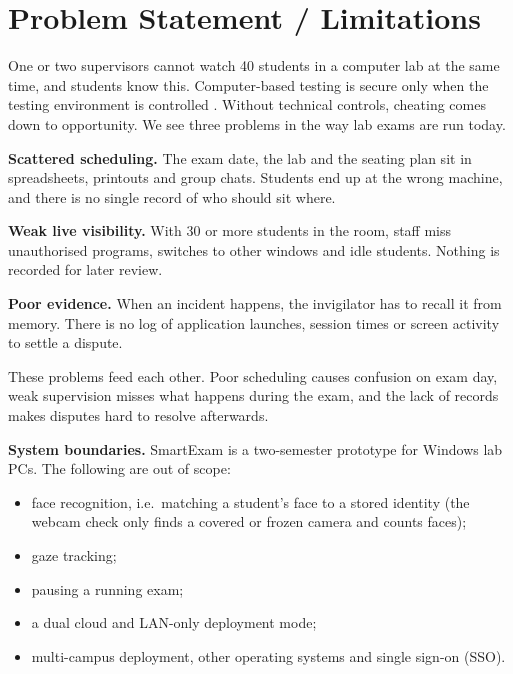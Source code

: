 \section{Problem Statement / Limitations}

One or two supervisors cannot watch 40 students in a computer lab at the same time, and students know this. Computer-based testing is secure only when the testing environment is controlled \cite{mit_cbt}. Without technical controls, cheating comes down to opportunity. We see three problems in the way lab exams are run today.

\textbf{Scattered scheduling.} The exam date, the lab and the seating plan sit in spreadsheets, printouts and group chats. Students end up at the wrong machine, and there is no single record of who should sit where.

\textbf{Weak live visibility.} With 30 or more students in the room, staff miss unauthorised programs, switches to other windows and idle students. Nothing is recorded for later review.

\textbf{Poor evidence.} When an incident happens, the invigilator has to recall it from memory. There is no log of application launches, session times or screen activity to settle a dispute.

These problems feed each other. Poor scheduling causes confusion on exam day, weak supervision misses what happens during the exam, and the lack of records makes disputes hard to resolve afterwards.

\textbf{System boundaries.} SmartExam is a two-semester prototype for Windows lab PCs. The following are out of scope:
\begin{itemize}[noitemsep]
\item face recognition, i.e.\ matching a student's face to a stored identity (the webcam check only finds a covered or frozen camera and counts faces);
\item gaze tracking;
\item pausing a running exam;
\item a dual cloud and LAN-only deployment mode;
\item multi-campus deployment, other operating systems and single sign-on (SSO).
\end{itemize}
